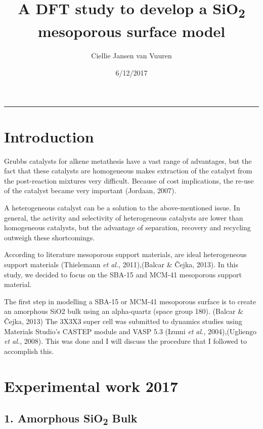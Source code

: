 \documentclass[]{article}
\title{A DFT study to develop a SiO\textsubscript{2} mesoporous surface model}
\author{Ciellie Jansen van Vuuren}
\date{6/12/2017}
\begin{document}
\maketitle

\begin{center}\rule{0.5\linewidth}{\linethickness}\end{center}

\hypertarget{introduction}{%
\section{Introduction}\label{introduction}}

Grubbs catalysts for alkene metathesis have a vast range of advantages,
but the fact that these catalysts are homogeneous makes extraction of
the catalyst from the post-reaction mixtures very difficult. Because of
cost implications, the re-use of the catalyst became very important
(Jordaan, 2007).

A heterogeneous catalyst can be a solution to the above-mentioned issue.
In general, the activity and selectivity of heterogeneous catalysts are
lower than homogeneous catalysts, but the advantage of separation,
recovery and recycling outweigh these shortcomings.

According to literature mesoporous support materials, are ideal
heterogeneous support materials (Thielemann \emph{et al.}, 2011),(Balcar
\& Čejka, 2013). In this study, we decided to focus on the SBA-15 and
MCM-41 mesoporous support material.

The first step in modelling a SBA-15 or MCM-41 mesoporous surface is to
create an amorphous SiO2 bulk using an alpha-quartz (space group 180).
(Balcar \& Čejka, 2013) The 3X3X3 super cell was submitted to dynamics
studies using Materials Studio's CASTEP module and VASP 5.3 (Izumi
\emph{et al.}, 2004),(Ugliengo \emph{et al.}, 2008). This was done and I
will discuss the procedure that I followed to accomplish this.

\hypertarget{experimental-work-2017}{%
\section{Experimental work 2017}\label{experimental-work-2017}}

\hypertarget{amorphous-sio2-bulk}{%
\subsection{\texorpdfstring{1. Amorphous SiO\textsubscript{2}
Bulk}{1. Amorphous SiO2 Bulk}}\label{amorphous-sio2-bulk}}
\end{document}
